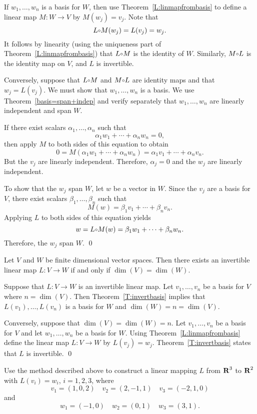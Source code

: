 \proof  If $w_1,\ldots,w_n$ is a basis for $W$, then use
Theorem~\ref{L:linmapfrombasis} to define a linear map $M:W\to V$ by
$M(w_j)=v_j$.  Note that
\[
L\compose M(w_j)= L(v_j) =w_j.
\]
It follows by linearity (using the uniqueness part of
Theorem~\ref{L:linmapfrombasis}) that $L\compose M$ is the identity of $W$.
Similarly, $M\compose L$ is the identity map on $V$, and $L$ is invertible.

Conversely, suppose that $L\compose M$ and $M\compose L$ are identity maps
and that $w_j=L(v_j)$.  We must show that $w_1,\ldots,w_n$ is a basis.  We
use Theorem~\ref{basis=span+indep} and verify separately that
$w_1,\ldots,w_n$ are linearly independent and span $W$.

If there exist scalars $\alpha_1,\ldots,\alpha_n$ such that
\[
\alpha_1w_1+\cdots +\alpha_nw_n = 0,
\]
then apply $M$ to both sides of this equation to obtain
\[
0=M(\alpha_1w_1+\cdots +\alpha_nw_n)=\alpha_1v_1+\cdots+\alpha_nv_n.
\]
But the $v_j$ are linearly independent.  Therefore, $\alpha_j=0$ and the
$w_j$ are linearly independent.

To show that the $w_j$ span $W$, let $w$ be a vector in $W$.  Since the $v_j$
are a basis for $V$, there exist scalars $\beta_1,\ldots,\beta_n$ such that
\[
M(w) = \beta_1v_1+\cdots+\beta_nv_n.
\]
Applying $L$ to both sides of this equation yields
\[
w = L\compose M(w) = \beta_1w_1+\cdots+\beta_nw_n.
\]
Therefore, the $w_j$ span $W$.  \qed

\begin{cor}
Let $V$ and $W$ be finite dimensional vector spaces.  Then there exists
an invertible linear map $L:V\to W$
if and only if $\dim(V)=\dim(W)$.
\end{cor}

\proof  Suppose that $L:V\to W$ is an invertible linear map.  Let
$v_1,\ldots,v_n$ be a basis for $V$ where $n=\dim(V)$.  Then
Theorem~\ref{T:invertbasis} implies that $L(v_1),\ldots,L(v_n)$ is a basis
for $W$ and $\dim(W)=n=\dim(V)$.

Conversely, suppose that $\dim(V)=\dim(W)=n$.  Let $v_1,\ldots,v_n$ be a
basis for $V$ and let $w_1,\ldots,w_n$ be a basis for $W$.  Using
Theorem~\ref{L:linmapfrombasis} define the linear map $L:V\to W$ by
$L(v_j)=w_j$.  Theorem~\ref{T:invertbasis} states that $L$ is invertible. \qed

\EXER

\TEXER

\begin{exercise} \label{c7.2.1}
Use the method described above to construct a linear mapping $L$
from $\mbox{$\bf{R}$}^3$ to $\mbox{$\bf{R}$}^2$ with $L(v_i)=w_i$, $i=1,2,3$, where
\[
v_1=(1,0,2)\quad v_2=(2,-1,1) \quad v_3=(-2,1,0)
\]
and
\[
w_1=(-1,0) \quad w_2=(0,1) \quad w_3=(3,1).
\]
\end{exercise}


